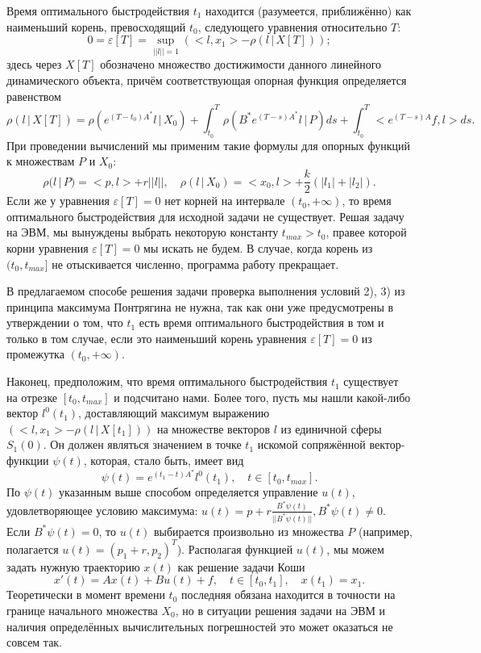 \documentclass[12pt,titlepage]{article}
\begin{document}
Время оптимального быстродействия $ t_{1} $ находится (разумеется, приближённо) как наименьший корень, превосходящий $ t_{0} $,
следующего уравнения относительно $ T $:
$$
0 = \varepsilon[T] = \sup_{ ||l|| = 1 } ( <l, x_{1}> - \rho(l \,|\, X[T]) );
$$
здесь через $ X[T] $ обозначено множество достижимости данного линейного динамического объекта, причём соответствующая
опорная функция определяется равенством
$$
\rho(l \,|\, X[T]) = \rho( e^{ (T - t_{0})A^{*} }l \,|\, X_{0} ) + \int_{t_{0}}^{T} \rho( B^{*} e^{ (T - s)A^{*} }l \,|\, P ) ds
  + \int_{t_{0}}^{T} < e^{ (T - s)A }f, l> ds.
$$
При проведении вычислений мы применим такие формулы для опорных функций к множествам $ P $ и $ X_{0} $:
$$
\rho( l \,|\, P ) = <p, l> + r||l||, \quad \rho(l \,|\, X_{0}) = <x_{0}, l> + \frac{k}{2}( |l_{1}| + |l_{2}| ).
$$
Если же у уравнения $ \varepsilon[T] = 0 $ нет корней на интервале $ (t_{0}, +\infty) $, то время оптимального быстродействия
для исходной задачи не существует. Решая задачу на ЭВМ, мы вынуждены выбрать некоторую константу $ t_{max} > t_{0} $,
правее которой корни уравнения $ \varepsilon[T] = 0 $ мы искать не будем. В случае, когда корень из $ (t_{0}, t_{max}] $
не отыскивается численно, программа работу прекращает.

В предлагаемом способе решения задачи проверка выполнения условий 2), 3) из принципа максимума Понтрягина
не нужна, так как они уже предусмотрены в утверждении о том, что $ t_{1} $ есть время оптимального быстродействия
в том и только в том случае, если это наименьший корень уравнения $ \varepsilon[T] = 0 $ из промежутка $ (t_{0}, +\infty) $.

Наконец, предположим, что время оптимального быстродействия $ t_{1} $ существует на отрезке $ [ t_{0}, t_{max} ] $ и подсчитано
нами. Более того, пусть мы нашли какой-либо вектор $ l^{0}(t_{1}) $, доставляющий максимум выражению
$ ( <l, x_{1}> - \rho(l \,|\, X[t_{1}]) ) $ на множестве векторов $ l $ из единичной сферы $ S_{1}(0) $. Он должен являться
значением в точке $ t_{1} $ искомой сопряжённой вектор-функции $ \psi(t) $, которая, стало быть, имеет вид
$$
\psi(t) = e^{ (t_{1} - t)A^{*} } l^{0}(t_{1}), \quad t \in [t_{0}, t_{max}].
$$
По $ \psi(t) $ указанным выше способом определяется управление $ u(t) $, удовлетворяющее условию максимума:
$ u(t) = p + r \frac{ B^{*}\psi(t) }{ || B^{*}\psi(t) || }, B^{*}\psi(t) \ne 0 $. Если $ B^{*}\psi(t) = 0 $,
то $ u(t) $ выбирается произвольно из множества $ P $ (например, полагается $ u(t) = (p_{1} + r, p_{2})^{T} $).
Располагая функцией $ u(t) $, мы можем задать нужную траекторию $ x(t) $ как решение задачи Коши
$$
x'(t) = Ax(t) + Bu(t) + f, \quad t \in [t_{0}, t_{1}], \quad x(t_{1}) = x_{1}.
$$
Теоретически в момент времени $ t_{0} $ последняя обязана находится в точности на границе начального множества $ X_{0} $, но
в ситуации решения задачи на ЭВМ и наличия определённых вычислительных погрешностей это может оказаться не совсем так.
\end{document}
